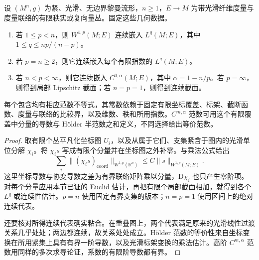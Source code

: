 \begin{theorem}\label{g3:thm:compact-bundle-sobolev}
	设 \((M^n,g)\) 为紧、光滑、无边界黎曼流形，\(n\ge1\)，\(E\to M\) 为带光滑纤维度量与度量联络的有限秩实或复向量丛。固定这些几何数据。
	\begin{enumerate}
		\item 若 \(1\le p<n\)，则 \(W^{1,p}(M;E)\) 连续嵌入 \(L^q(M;E)\)，其中 \(1\le q\le np/(n-p)\)。
		\item 若 \(p=n\ge2\)，则它连续嵌入每个有限指数的 \(L^q(M;E)\)。
		\item 若 \(n<p<\infty\)，则它连续嵌入 \(C^{0,\alpha}(M;E)\)，其中 \(\alpha=1-n/p\)。若 \(p=\infty\)，则得到局部 Lipschitz 截面；若 \(n=p=1\)，则得到连续截面。
	\end{enumerate}
	每个包含均有相应范数不等式，其常数依赖于固定有限坐标覆盖、标架、截断函数、度量与联络的比较界，以及维数、秩和所用指数。\(C^{m,\alpha}\) 范数可用这个有限覆盖中分量的导数与 Hölder 半范数之和定义，不同选择给出等价范数。
\end{theorem}
\begin{proof}
	取有限个丛平凡化坐标图 \(U_i\)，以及从属于它们、支集紧含于图内的光滑单位分解 \(\chi_i\)。将 \(\chi_i s\) 写成有限个分量并在坐标图之外补零。与乘法公式给出
	\[
		\sum_i\|(\chi_i s)_{\mathrm{coord}}\|_{W^{1,p}(\mathbb R^n)}
		\le C\|s\|_{W^{1,p}(M;E)}.
	\]
	这里坐标导数与协变导数之差为有界联络矩阵乘以分量，\(\mathrm D\chi_i\) 也只产生零阶项。对每个分量应用本节已证的 Euclid 估计，再把有限个局部截面相加，就得到各个 \(L^q\) 或连续性估计。\(p=n\) 使用固定有界支集的版本；\(n=p=1\) 使用区间上的绝对连续代表。

	还要核对所得连续代表确实粘合。在重叠图上，两个代表满足原来的光滑线性过渡关系几乎处处；两边都连续，故关系处处成立。Hölder 范数的等价性来自坐标变换在所用紧集上具有有界一阶导数，以及光滑标架变换的乘法估计。高阶 \(C^{m,\alpha}\) 范数用同样的多次求导论证，系数的有限阶导数都有界。
\end{proof}


